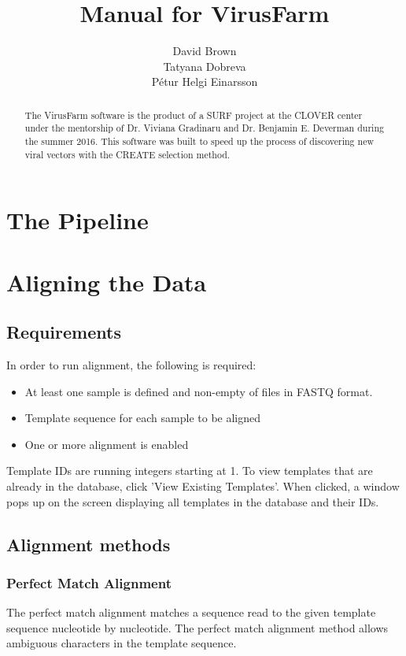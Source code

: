 \documentclass[12pt,a4paper]{article}
\title{Manual for VirusFarm}
\author{David Brown\\Tatyana Dobreva\\Pétur Helgi Einarsson}
\begin{document}
\sloppy
\maketitle

\begin{abstract}
The VirusFarm software is the product of a SURF project at the CLOVER center 
under the mentorship of Dr. Viviana Gradinaru and Dr. Benjamin E. Deverman 
during the summer 2016. This software was built to speed up the process of
 discovering new viral vectors with the CREATE selection method.
\end{abstract}

\tableofcontents

\newpage

\section{The Pipeline}

\newpage
\section{Aligning the Data}

\subsection{Requirements}
In order to run alignment, the following is required:

\begin{itemize}
    \item At least one sample is defined and non-empty of files in FASTQ format.
    \item Template sequence for each sample to be aligned
    \item One or more alignment is enabled
\end{itemize}

Template IDs are running integers starting at 1. To view templates that are 
already in the database, click 'View Existing Templates'. When clicked, a 
window pops up on the screen displaying all templates in the database and their 
IDs. 

\subsection{Alignment methods}

\subsubsection{Perfect Match Alignment}
The perfect match alignment matches a sequence read to the given template 
sequence nucleotide by nucleotide. The perfect match alignment method allows 
ambiguous characters in the template sequence.
\end{document}
